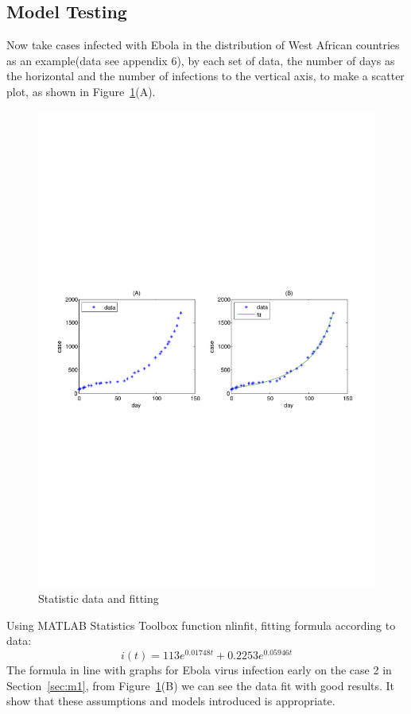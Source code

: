 \subsection{Model Testing}
Now take cases infected with Ebola in the distribution of West
African countries as an example(data see appendix 6), by each
set of data, the number of days as the horizontal and the number of infections to
the vertical axis, to make a scatter plot, as shown in
Figure~\ref{fig:5}(A).
\begin{figure}
\centering
\includegraphics[width=4.7in]{imgs/sum_anly.pdf}
\caption{Statistic data and fitting}
\label{fig:5}
\end{figure}
Using MATLAB Statistics Toolbox function nlinfit, fitting
formula according to data:
\begin{equation}
i(t)=113e^{0.01748t}+0.2253e^{0.05946t}
\label{equ:14}
\end{equation}
The formula in line with graphs for Ebola
virus infection early on the case 2 in Section~\ref{sec:m1},
from Figure~\ref{fig:5}(B) we can see the data fit with good
results. It show that these assumptions and models
introduced is appropriate.

